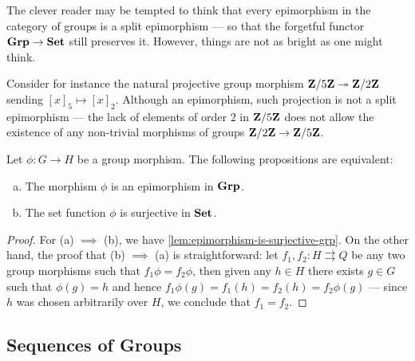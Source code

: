 \begin{remark}
\label{rem:not-every-grp-epi-is-split}
The clever reader may be tempted to think that every epimorphism in the category
of groups is a split epimorphism --- so that the forgetful functor
\({\textbf{Grp}} \to {\textbf{Set}}\) still preserves it. However, things are not as bright as one
might think.

Consider for instance the natural projective group morphism
\(\mathbf{Z}/5\mathbf{Z} \twoheadrightarrow \mathbf{Z}/2\mathbf{Z}\) sending \([x]_5 \mapsto [x]_2\). Although an epimorphism,
such projection is not a split epimorphism --- the lack of elements of order
\(2\) in \(\mathbf{Z}/5\mathbf{Z}\) does not allow the existence of any non-trivial morphisms of
groups \(\mathbf{Z}/2\mathbf{Z} \to \mathbf{Z}/5\mathbf{Z}\).
\end{remark}

\begin{proposition}
\label{prop:epic-in-grp}
Let \(\phi: G \to H\) be a group morphism. The following propositions are
equivalent:
\begin{enumerate}[(a)]\setlength\itemsep{0em}
\item The morphism \(\phi\) is an epimorphism in \({\textbf{Grp}}\).
\item The set function \(\phi\) is surjective in \({\textbf{Set}}\).
\end{enumerate}
\end{proposition}

\begin{proof}
For (a) \(\implies\) (b), we have \cref{lem:epimorphism-is-surjective-grp}. On
the other hand, the proof that (b) \(\implies\) (a) is straightforward: let
\(f_1, f_2: H \rightrightarrows Q\) be any two group morphisms such that
\(f_1 \phi = f_2 \phi\), then given any \(h \in H\) there exists \(g \in G\)
such that \(\phi(g) = h\) and hence \(f_1\phi(g) = f_1(h) = f_2(h) = f_2
\phi(g)\) --- since \(h\) was chosen arbitrarily over \(H\), we conclude that
\(f_1 = f_2\).
\end{proof}

\subsection{Sequences of Groups}


